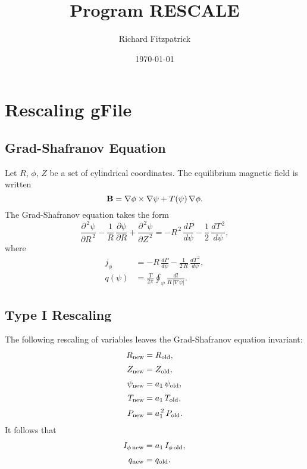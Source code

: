 \documentclass[12pt]{article}
\title{\bf Program {\sc RESCALE}}
\date{\today}
\author{Richard Fitzpatrick}
\begin{document}
\maketitle

\section{Rescaling gFile}
\subsection{Grad-Shafranov Equation}
Let $R$, $\phi$, $Z$ be a set of cylindrical coordinates. 
The equilibrium magnetic field is written
\begin{equation}
{\bf B} = \nabla\phi\times\nabla\psi + T(\psi)\,\nabla\phi.
\end{equation}
The Grad-Shafranov equation takes the form
\begin{equation}
\frac{\partial^{\,2}\psi}{\partial R^{\,2}}-\frac{1}{R}\,\frac{\partial\psi}{\partial R} + \frac{\partial^{\,2}\psi}{\partial Z^{\,2}} = -R^{\,2}\,\frac{dP}{d\psi} - \frac{1}{2}\,\frac{dT^{\,2}}{d\psi},
\end{equation}
where
\begin{align}
j_\phi &= -R\,\frac{dP}{d\psi}- \frac{1}{2\,R}\,\frac{dT^{\,2}}{d\psi},\\[0.5ex]
q(\psi) &= \frac{T}{2\pi}\oint_\psi \frac{dl}{R\,|\nabla \psi|}.
\end{align}

\subsection{Type I Rescaling}
The following rescaling of variables leaves the Grad-Shafranov equation invariant:
\begin{align}
R_{\rm new}&=R_{\rm old},\\[0.5ex]
Z_{\rm new}&=Z_{\rm old},\\[0.5ex]
\psi_{\rm new} &= a_1\,\psi_{\rm old},\\[0.5ex]
T_{\rm new} &=a_1\,T_{\rm old},\\[0.5ex]
P_{\rm new} &=a_1^{\,2}\,P_{\rm old}.
\end{align}
It follows that
\begin{align}
I_{\phi\,{\rm new}} &= a_1\,I_{\phi\,{\rm old}},\\[0.5ex]
q_{\rm new} &= q_{\rm old}.
\end{align} 
\end{document}
